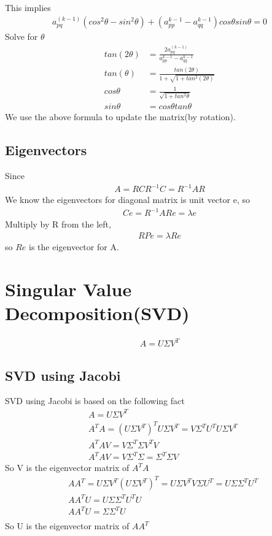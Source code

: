 \documentclass[a4paper]{article}
\begin{document}
This implies
\begin{align*}
	a_{pq}^{(k-1)} (cos^2 \theta - sin^2 \theta) + (a_{pp}^{k-1} - a_{qq}^{k-1}) cos \theta sin \theta = 0
\end{align*}
Solve for $\theta$
\begin{align*}
	tan(2\theta) & = \frac{2 a_{pq}^{(k-1)}}{a_{pp}^{k-1} - a_{qq}^{k-1}} \\
	tan(\theta) & = \frac{tan(2 \theta)}{1 + \sqrt{1 + tan^2 (2 \theta)}} \\
	cos \theta & = \frac{1}{\sqrt{1 + tan^2 \theta}} \\
	sin \theta & = cos \theta tan \theta
\end{align*}
We use the above formula to update the matrix(by rotation). \\
\subsection{Eigenvectors}
Since 
\begin{align*}
	A = R C R^{-1}
	C = R^{-1} A R 
\end{align*}
We know the eigenvectors for diagonal matrix is unit vector e, so
\begin{align*}
	Ce = R^{-1} A R e = \lambda e
\end{align*}
Multiply by R from the left, 
\begin{align*}
	RPe = \lambda Re
\end{align*}
so $Re$ is the eigenvector for A.
\section{Singular Value Decomposition(SVD)}
\begin{align*}
	A = U \Sigma V^T
\end{align*}
\subsection{SVD using Jacobi}
SVD using Jacobi is based on the following fact
\begin{align*}
	& A = U \Sigma V^T \\
	& A^T A = (U \Sigma V^T)^T U \Sigma V^T = V \Sigma^T U^T U\Sigma V^T \\
	& A^T A V = V \Sigma^T \Sigma V^T V \\
	& A^T A V = V \Sigma^T \Sigma = \Sigma^T \Sigma V
\end{align*}
So V is the eigenvector matrix of $A^T A$\\
\begin{align*}
	& A A^T =  U \Sigma V^T (U \Sigma V^T)^T = U \Sigma V^T V \Sigma U^T = U \Sigma \Sigma^T U^T \\
	& A A^T U =  U \Sigma \Sigma^T U^T U \\
	& A A^T U =  \Sigma \Sigma^T U \\
\end{align*}
So U is the eigenvector matrix of $A A^T$\\
\end{document}
